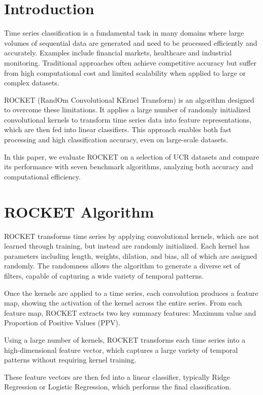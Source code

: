 \documentclass[conference]{IEEEtran}
\begin{document}
\section{Introduction}
Time series classification is a fundamental task in many domains where large volumes of sequential data are generated and need to be processed efficiently and accurately. Examples include financial markets, healthcare and industrial monitoring. Traditional approaches often achieve competitive accuracy but suffer from high computational cost and limited scalability when applied to large or complex datasets.

ROCKET (RandOm Convolutional KErnel Transform) is an algorithm designed to overcome these limitations. It applies a large number of randomly initialized convolutional kernels to transform time series data into feature representations, which are then fed into linear classifiers. This approach enables both fast processing and high classification accuracy, even on large-scale datasets. 

In this paper, we evaluate ROCKET on a selection of UCR datasets and compare its performance with seven benchmark algorithms, analyzing both accuracy and computational efficiency.

\section{ROCKET Algorithm}
ROCKET transforms time series by applying convolutional kernels, which are not learned through training, but instead are randomly initialized. Each kernel has parameters including length, weights, dilation, and bias, all of which are assigned randomly. The randomness allows the algorithm to generate a diverse set of filters, capable of capturing a wide variety of temporal patterns. 

Once the kernels are applied to a time series, each convolution produces a feature map, showing the activation of the kernel across the entire series. From each feature map, ROCKET extracts two key summary features: Maximum value and Proportion of Positive Values (PPV).  

Using a large number of kernels, ROCKET transforms each time series into a high-dimensional feature vector, which captures a large variety of temporal patterns without requiring kernel training. 

These feature vectors are then fed into a linear classifier, typically Ridge Regression or Logistic Regression, which performs the final classification. 
\end{document}
